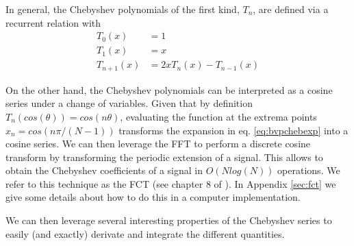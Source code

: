 \documentclass[ twoside,openright,titlepage,numbers=noenddot,%
headinclude,footinclude,cleardoublepage=empty,abstract=on,
BCOR=5mm,paper=a4,fontsize=11pt, dvipsnames
]{scrreprt}
\newcommand{\uammd}{\gls{UAMMD}\xspace}
\begin{document}
In general, the Chebyshev polynomials of the first kind, $T_n$, are defined via a recurrent relation with
\begin{equation}
  \label{eq:bvpchebpoly}
  \begin{aligned}
    T_0(x) &= 1\\
    T_1(x) &= x\\
    T_{n+1}(x) &= 2xT_n(x) - T_{n-1}(x)
  \end{aligned}
\end{equation}

On the other hand, the Chebyshev polynomials can be interpreted as a cosine series under a change of variables. Given that by definition $T_n(cos(\theta))= cos(n\theta)$, evaluating the function at the extrema points $x_n = cos(n\pi/(N-1))$ transforms the expansion in eq. \eqref{eq:bvpchebexp} into a cosine series. We can then leverage the \gls{FFT} to perform a discrete cosine transform by transforming the periodic extension of a signal. This allows to obtain the Chebyshev coefficients of a signal in $O(Nlog(N))$ operations. We refer to this technique as the \gls{FCT} (see chapter 8 of \cite{Trefethen2000}). In Appendix \ref{sec:fct} we give some details about how to do this in a computer implementation.

We can then leverage several interesting properties of the Chebyshev series to easily (and exactly) derivate and integrate the different quantities.

\end{document}

